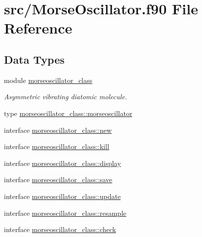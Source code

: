\hypertarget{_morse_oscillator_8f90}{\section{src/\+Morse\+Oscillator.f90 File Reference}
\label{_morse_oscillator_8f90}
}
\subsection*{Data Types}
\begin{DoxyCompactItemize}
\item 
module \hyperlink{classmorseoscillator__class}{morseoscillator\+\_\+class}
\begin{DoxyCompactList}\small\item\em Asymmetric vibrating diatomic molecule. \end{DoxyCompactList}\item 
type \hyperlink{structmorseoscillator__class_1_1morseoscillator}{morseoscillator\+\_\+class\+::morseoscillator}
\item 
interface \hyperlink{interfacemorseoscillator__class_1_1new}{morseoscillator\+\_\+class\+::new}
\item 
interface \hyperlink{interfacemorseoscillator__class_1_1kill}{morseoscillator\+\_\+class\+::kill}
\item 
interface \hyperlink{interfacemorseoscillator__class_1_1display}{morseoscillator\+\_\+class\+::display}
\item 
interface \hyperlink{interfacemorseoscillator__class_1_1save}{morseoscillator\+\_\+class\+::save}
\item 
interface \hyperlink{interfacemorseoscillator__class_1_1update}{morseoscillator\+\_\+class\+::update}
\item 
interface \hyperlink{interfacemorseoscillator__class_1_1resample}{morseoscillator\+\_\+class\+::resample}
\item 
interface \hyperlink{interfacemorseoscillator__class_1_1check}{morseoscillator\+\_\+class\+::check}
\end{DoxyCompactItemize}
